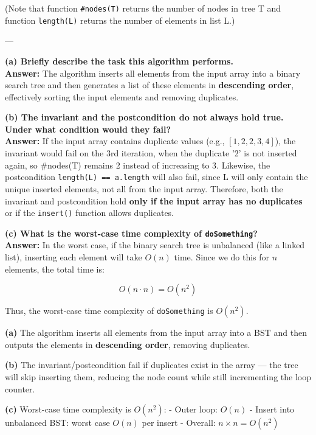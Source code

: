 (Note that function \texttt{\#nodes(T)} returns the number of nodes in tree T and function \texttt{length(L)} returns the number of elements in list L.)

---

\textbf{(a) Briefly describe the task this algorithm performs.} \\
\textbf{Answer:}  
The algorithm inserts all elements from the input array into a binary search tree and then generates a list of these elements in \textbf{descending order}, effectively sorting the input elements and removing duplicates.

\textbf{(b) The invariant and the postcondition do not always hold true. Under what condition would they fail?} \\
\textbf{Answer:}  
If the input array contains duplicate values (e.g., $[1, 2, 2, 3, 4]$), the invariant would fail on the 3rd iteration, when the duplicate '2' is not inserted again, so \#nodes(T) remains 2 instead of increasing to 3.
Likewise, the postcondition \texttt{length(L) == a.length} will also fail, since L will only contain the unique inserted elements, not all from the input array.
Therefore, both the invariant and postcondition hold \textbf{only if the input array has no duplicates} or if the \texttt{insert()} function allows duplicates.

\textbf{(c) What is the worst-case time complexity of \texttt{doSomething}?} \\
\textbf{Answer:}  
In the worst case, if the binary search tree is unbalanced (like a linked list), inserting each element will take $O(n)$ time. Since we do this for $n$ elements, the total time is:

\[
O(n \cdot n) = O(n^2)
\]

Thus, the worst-case time complexity of \texttt{doSomething} is $O(n^2)$.

\textbf{(a)} The algorithm inserts all elements from the input array into a BST and then outputs the elements in \textbf{descending order}, removing duplicates.

\textbf{(b)} The invariant/postcondition fail if duplicates exist in the array — the tree will skip inserting them, reducing the node count while still incrementing the loop counter.

\textbf{(c)} Worst-case time complexity is $O(n^2)$:
- Outer loop: $O(n)$
- Insert into unbalanced BST: worst case $O(n)$ per insert
- Overall: $n \times n = O(n^2)$


